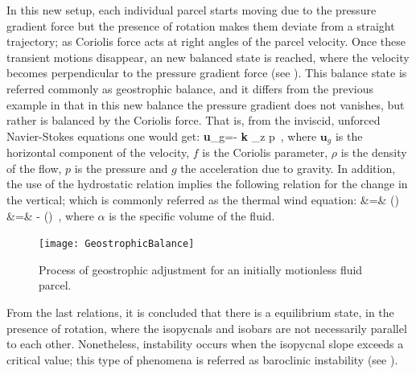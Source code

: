 In this new setup, each individual parcel starts moving due to the
pressure gradient force but the presence of rotation makes them deviate
from a straight trajectory; as Coriolis force acts at right
angles of the parcel velocity. Once these transient motions
disappear, an new balanced state is reached, where the velocity becomes
perpendicular to the pressure gradient force (see ).
This balance state is referred commonly as geostrophic balance, and it
differs from the previous example in that in this new balance the
pressure gradient does not vanishes, but rather is balanced by the
Coriolis force. That is, from the inviscid, unforced Navier-Stokes
equations one would get:
\beq
\textbf{u}_g=- \textbf{k} \times \nabla_z p
\,,
where $\textbf{u}_g$ is the horizontal component of the velocity, $f$ is
the Coriolis parameter, $\rho$ is the density of the flow, $p$ is the
pressure and $g$ the acceleration due to gravity. In addition, the use of
the hydrostatic relation implies the following relation for the change in
the vertical; which is commonly referred as the thermal wind
equation:
\bea
{}
    &=&  \left(\right)
\continue
{}
    &=& - \left(\right)
\,,
\label{eq:TWE}
\eea
where $\alpha$ is the specific volume of the fluid.

\begin{figure}
\begin{center}
  \texttt{[image: GeostrophicBalance]}\\
\end{center}
  \caption{Process of geostrophic adjustment for an initially motionless fluid parcel.}
  \label{f:GBalance}
\end{figure}

From the last relations, it is concluded that there is a equilibrium state,
 in the presence of rotation, where the isopycnals and
isobars are not necessarily parallel to each other. Nonetheless,
instability occurs when the isopycnal slope exceeds a critical value;
this type of phenomena is referred as baroclinic instability (see
).

